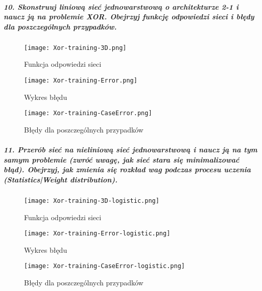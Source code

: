\documentclass{article}
\begin{document}
\subparagraph{10. Skonstruuj liniową sieć jednowarstwową o architekturze 2-1 i naucz ją na problemie XOR. Obejrzyj funkcję odpowiedzi sieci i błędy dla poszczególnych przypadków.\\}

\begin{figure}[H]
\begin{center}
\texttt{[image: Xor-training-3D.png]}
\end{center}
\caption{Funkcja odpowiedzi sieci}
\label{fig-1Tdelta}
\end{figure}

\begin{figure}[H]
\begin{center}
\texttt{[image: Xor-training-Error.png]}
\end{center}
\caption{Wykres błędu}
\label{fig-1Tdelta}
\end{figure}

\begin{figure}[H]
\begin{center}
\texttt{[image: Xor-training-CaseError.png]}
\end{center}
\caption{Błędy dla poszczególnych przypadków}
\label{fig-1Tdelta}
\end{figure}
 
\subparagraph{11. Przerób sieć na nieliniową sieć jednowarstwową i naucz ją na tym samym problemie (zwróć uwagę, jak sieć stara się minimalizować błąd). Obejrzyj, jak zmienia się rozkład wag podczas procesu uczenia (Statistics|Weight distribution).\\}

\begin{figure}[H]
\begin{center}
\texttt{[image: Xor-training-3D-logistic.png]}
\end{center}
\caption{Funkcja odpowiedzi sieci}
\label{fig-1Tdelta}
\end{figure}

\begin{figure}[H]
\begin{center}
\texttt{[image: Xor-training-Error-logistic.png]}
\end{center}
\caption{Wykres błędu}
\label{fig-1Tdelta}
\end{figure}

\begin{figure}[H]
\begin{center}
\texttt{[image: Xor-training-CaseError-logistic.png]}
\end{center}
\caption{Błędy dla poszczególnych przypadków}
\label{fig-1Tdelta}
\end{figure}
\end{document}
